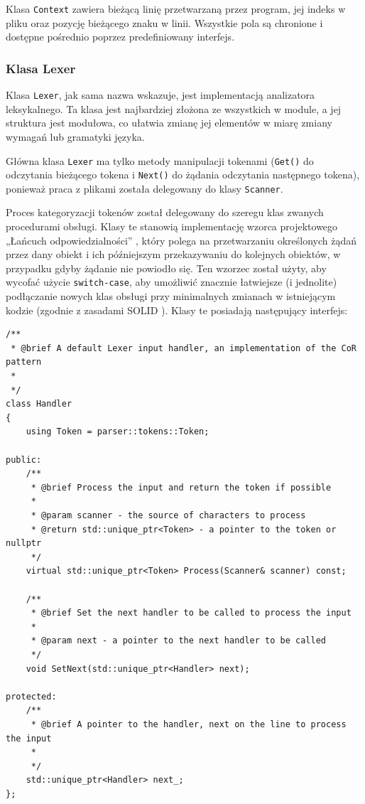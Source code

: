 Klasa \texttt{Context} zawiera bieżącą linię przetwarzaną przez program, jej indeks w pliku oraz pozycję bieżącego znaku w linii. Wszystkie pola są chronione i dostępne pośrednio poprzez predefiniowany interfejs.

\subsubsection{Klasa Lexer}
Klasa \texttt{Lexer}, jak sama nazwa wskazuje, jest implementacją analizatora leksykalnego. Ta klasa jest najbardziej złożona ze wszystkich w module, a jej struktura jest modułowa, co ułatwia zmianę jej elementów w miarę zmiany wymagań lub gramatyki języka.

Główna klasa \texttt{Lexer} ma tylko metody manipulacji tokenami (\texttt{Get()} do odczytania bieżącego tokena i \texttt{Next()} do żądania odczytania następnego tokena), ponieważ praca z plikami została delegowany do klasy \texttt{Scanner}.

Proces kategoryzacji tokenów został delegowany do szeregu klas zwanych procedurami obsługi. Klasy te stanowią implementację wzorca projektowego „Łańcuch odpowiedzialności” \cite{cor}, który polega na przetwarzaniu określonych żądań przez dany obiekt i ich późniejszym przekazywaniu do kolejnych obiektów, w przypadku gdyby żądanie nie powiodło się. Ten wzorzec został użyty, aby wycofać użycie \texttt{switch-case}, aby umożliwić znacznie łatwiejsze (i jednolite) podłączanie nowych klas obsługi przy minimalnych zmianach w istniejącym kodzie (zgodnie z zasadami SOLID \cite{solid}). Klasy te posiadają następujący interfejs:

\begin{lstlisting}[label=list:handler,caption=Klasa Handler,basicstyle=\footnotesize\ttfamily]
/**
 * @brief A default Lexer input handler, an implementation of the CoR pattern
 * 
 */
class Handler
{
    using Token = parser::tokens::Token;
    
public:
    /**
     * @brief Process the input and return the token if possible
     * 
     * @param scanner - the source of characters to process
     * @return std::unique_ptr<Token> - a pointer to the token or nullptr 
     */
    virtual std::unique_ptr<Token> Process(Scanner& scanner) const;
    
    /**
     * @brief Set the next handler to be called to process the input
     * 
     * @param next - a pointer to the next handler to be called
     */
    void SetNext(std::unique_ptr<Handler> next);
    
protected:
    /**
     * @brief A pointer to the handler, next on the line to process the input
     * 
     */
    std::unique_ptr<Handler> next_;
};
\end{lstlisting}

